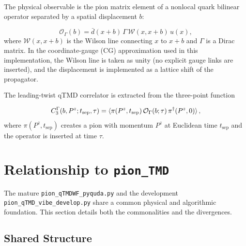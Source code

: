 \documentclass[11pt]{article}
\begin{document}
The physical observable is the pion matrix element of a nonlocal quark bilinear operator separated by a spatial displacement $b$:

\begin{equation}
    \mathcal{O}_{\Gamma}(b) = \bar{d}(x + b)\, \Gamma\, \mathcal{W}(x, x+b)\, u(x),
\end{equation}
where $\mathcal{W}(x, x+b)$ is the Wilson line connecting $x$ to $x+b$ and $\Gamma$ is a Dirac matrix. In the coordinate-gauge (CG) approximation used in this implementation, the Wilson line is taken as unity (no explicit gauge links are inserted), and the displacement is implemented as a lattice shift of the propagator.

The leading-twist qTMD correlator is extracted from the three-point function

\begin{equation}
    C_3^{\Gamma}(b, P^z; t_{\text{sep}}, \tau) = \braket{\pi(P^z, t_{\text{sep}}) \, \mathcal{O}_{\Gamma}(b; \tau) \, \pi^\dagger(P^z, 0)},
\end{equation}
where $\pi(P^z, t_{\text{sep}})$ creates a pion with momentum $P^z$ at Euclidean time $t_{\text{sep}}$ and the operator is inserted at time $\tau$.

\section{Relationship to \texttt{pion\_TMD}}

The mature \texttt{pion\_qTMDWF\_pyquda.py} and the development \texttt{pion\_qTMD\_vibe\_develop.py} share a common physical and algorithmic foundation. This section details both the commonalities and the divergences.

\subsection{Shared Structure}
\end{document}
